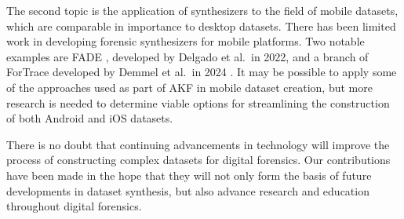 The second topic is the application of synthesizers to the field of
mobile datasets, which are comparable in importance to desktop datasets.
There has been limited work in developing forensic synthesizers for
mobile platforms. Two notable examples are FADE
\cite{ceballosdelgadoFADEForensicImage2022}, developed by Delgado et
al.~in 2022, and a branch of ForTrace developed by Demmel et al.~in 2024
\cite{demmelDataSynthesisGoing2024}. It may be possible to apply
some of the approaches used as part of AKF in mobile dataset creation,
but more research is needed to determine viable options for streamlining
the construction of both Android and iOS datasets.

There is no doubt that continuing advancements in technology will
improve the process of constructing complex datasets for digital
forensics. Our contributions have been made in the hope that they will
not only form the basis of future developments in dataset synthesis, but
also advance research and education throughout digital forensics.
